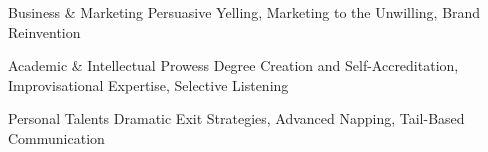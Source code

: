 

\begin{cvskills}

  \cvskill
    {Business \& Marketing} %
    {Persuasive Yelling, Marketing to the Unwilling, Brand Reinvention} %

  \cvskill
    {Academic \& Intellectual Prowess} %
    {Degree Creation and Self-Accreditation, Improvisational Expertise, Selective Listening} %

  \cvskill
    {Personal Talents} %
    {Dramatic Exit Strategies, Advanced Napping, Tail-Based Communication} %

\end{cvskills}
